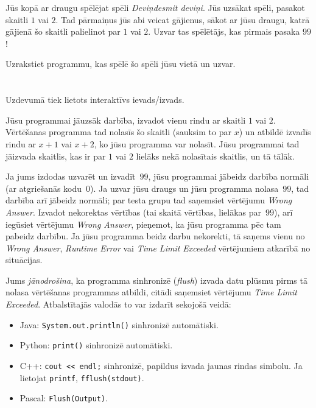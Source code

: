 \ifx\boi\undefined\fi
\def\version{jury-1}

Jūs kopā ar draugu spēlējat spēli \emph{Deviņdesmit deviņi}.
Jūs uzsākat spēli, pasakot skaitli $1$ vai $2$.
Tad pārmaiņus jūs abi veicat gājienus, sākot ar jūsu draugu, katrā gājienā šo skaitli palielinot par $1$ vai $2$.
Uzvar tas spēlētājs, kas pirmais pasaka $99$!

Uzrakstiet programmu, kas spēlē šo spēli jūsu vietā un uzvar.

\section*{\interactivity}
Uzdevumā tiek lietots interaktīvs ievads/izvads.

Jūsu programmai jāuzsāk darbība, izvadot vienu rindu ar skaitli $1$ vai $2$.
Vērtēšanas programma tad nolasīs šo skaitli (sauksim to par $x$) un atbildē izvadīs rindu ar $x+1$ vai $x+2$, ko jūsu programma var nolasīt.
Jūsu programmai tad jāizvada skaitlis, kas ir par $1$ vai $2$ lielāks nekā nolasītais skaitlis, un tā tālāk.

Ja jums izdodas uzvarēt un izvadīt~$99$, jūsu programmai jābeidz darbība normāli (ar atgriešanās kodu~0).
Ja uzvar jūsu draugs un jūsu programma nolasa~$99$, tad darbība arī jābeidz normāli; par testa grupu tad saņemsiet vērtējumu \emph{Wrong Answer}.
Izvadot nekorektas vērtības (tai skaitā vērtības, lielākas par~$99$), arī iegūsiet vērtējumu \emph{Wrong Answer}, pieņemot, ka jūsu programma pēc tam pabeidz darbību.
Ja jūsu programma beidz darbu nekorekti, tā saņems vienu no \emph{Wrong Answer}, \emph{Runtime Error} vai \emph{Time Limit Exceeded} vērtējumiem atkarībā no situācijas.

Jums \emph{jānodrošina}, ka programma sinhronizē (\emph{flush}) izvada datu plūsmu pirms tā nolasa vērtēšanas programmas atbildi, citādi
saņemsiet vērtējumu \emph{Time Limit Exceeded}. Atbalstītajās valodās to var izdarīt sekojošā veidā:
\begin{itemize}
  \item Java: \texttt{System.out.println()} sinhronizē automātiski.
  \item Python: \texttt{print()} sinhronizē automātiski.
  \item C++: \texttt{cout << endl;} sinhronizē, papildus izvada jaunas rindas simbolu. Ja lietojat \texttt{printf}, \texttt{fflush(stdout)}.
  \item Pascal: \texttt{Flush(Output)}.
\end{itemize}

